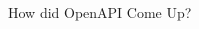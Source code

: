 \documentclass[bigger]{beamer}
\begin{document}
\begin{frame}[label={sec:org554819f}]{How did OpenAPI Come Up?}
\begin{columns}
\begin{column}{0.4\columnwidth}
\end{column}
\end{columns}
\end{frame}
\end{document}
